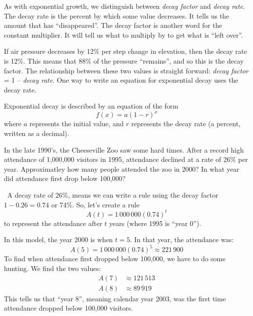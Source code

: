As with exponential growth, we distinguish between \textit{decay factor} and \textit{decay rate}. The decay rate is the percent by which some value decreases. It tells us the amount that has ``disappeared''. The decay factor is another word for the constant multiplier. It will tell us what to multiply by to get what is ``left over''.

If air pressure decreases by 12\% per step change in elevation, then the decay rate is 12\%. This means that 88\% of the pressure ``remains'', and so this is the decay factor. The relationship between these two values is straight forward: \textit{decay factor} = 1 -- \textit{decay rate}. One way to write an equation for exponential decay uses the decay rate.

\begin{boxdef}
Exponential decay is described by an equation of the form \[f(x)=a(1-r)^x\] where $a$ represents the initial value, and $r$ represents the decay rate (a percent, written as a decimal).
\end{boxdef}

\begin{boxex}
In the late 1990's, the Cheeseville Zoo saw some hard times. After a record high attendance of 1,000,000 visitors in 1995, attendance declined at a rate of 26\% per year. Approximatley how many people attended the zoo in 2000? In what year did attendance first drop below 100,000?

\exsoln\ A decay rate of 26\%, means we can write a rule using the decay factor $1-0.26 = 0.74$ or 74\%. So, let's create a rule \[A(t) = 1\,000\,000(0.74)^t\] to represent the attendance after $t$ years (where 1995 is ``year 0'').

In this model, the year 2000 is when $t=5$. In that year, the attendance was:
\[A(5) = 1\,000\,000(0.74)^5 \approx 221\,900\]
To find when attendance first dropped below 100,000, we have to do some hunting. We find the two values:
\[\begin{aligned}
A(7) &\approx 121\,513
\\
A(8) &\approx 89\,919
\end{aligned}\]
This tells us that ``year 8'', meaning calendar year 2003, was the first time attendance dropped below 100,000 visitors.
\end{boxex}

